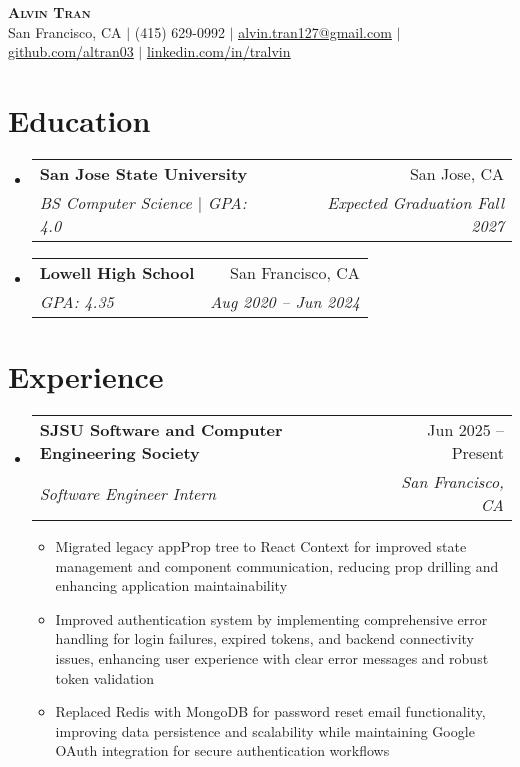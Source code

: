 \documentclass[letterpaper,11pt]{article}
\makeatletter
\newcommand{\resumeItem}[1]{
  \item\small{
    {#1 \vspace{-2pt}}
  }
}
\newcommand{\resumeSubheading}[4]{
  \vspace{-2pt}\item
    \begin{tabular*}{0.97\textwidth}[t]{l@{\extracolsep{\fill}}r}
      \textbf{#1} & #2 \\
      \textit{\small#3} & \textit{\small #4} \\
    \end{tabular*}\vspace{-7pt}
}
\newcommand{\resumeSubHeadingListStart}{\begin{itemize}[leftmargin=0.15in, label={}]}
\newcommand{\resumeSubHeadingListEnd}{\end{itemize}}
\newcommand{\resumeItemListStart}{\begin{itemize}}
\newcommand{\resumeItemListEnd}{\end{itemize}\vspace{-5pt}}
\makeatother
\begin{document}
\begin{center}
    \textbf{\Huge \scshape Alvin Tran} \\ \vspace{1pt}
    \small San Francisco, CA $|$ (415) 629-0992 $|$ \href{mailto:alvin.tran127@gmail.com}{\underline{alvin.tran127@gmail.com}} $|$ 
    \href{https://github.com/altran03}{\underline{github.com/altran03}} $|$
    \href{https://linkedin.com/in/tralvin}{\underline{linkedin.com/in/tralvin}}
\end{center}


\section{Education}
  \resumeSubHeadingListStart
    \resumeSubheading
      {San Jose State University}{San Jose, CA}
      {BS Computer Science $|$ GPA: 4.0}{Expected Graduation Fall 2027}
    \resumeSubheading
      {Lowell High School}{San Francisco, CA}
      {GPA: 4.35}{Aug 2020 -- Jun 2024}
  \resumeSubHeadingListEnd


\section{Experience}
  \resumeSubHeadingListStart

    \resumeSubheading
      {SJSU Software and Computer Engineering Society}{Jun 2025 -- Present}
      {Software Engineer Intern}{San Francisco, CA}
      \resumeItemListStart
        \resumeItem{Migrated legacy appProp tree to React Context for improved state management and component communication, reducing prop drilling and enhancing application maintainability}
        \resumeItem{Improved authentication system by implementing comprehensive error handling for login failures, expired tokens, and backend connectivity issues, enhancing user experience with clear error messages and robust token validation}
        \resumeItem{Replaced Redis with MongoDB for password reset email functionality, improving data persistence and scalability while maintaining Google OAuth integration for secure authentication workflows}
      \resumeItemListEnd

  \resumeSubHeadingListEnd


\end{document}
